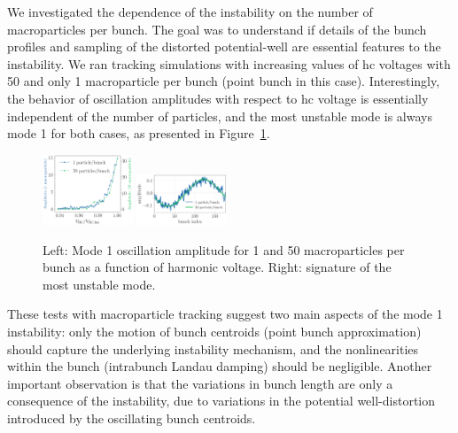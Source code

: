 \documentclass[a4paper,
               ]{jacow}
\begin{document}
We investigated the dependence of the instability on the number of macroparticles per bunch. The goal was to understand if details of the bunch profiles and sampling of the distorted potential-well are essential features to the instability. We ran tracking simulations with increasing values of \gls{hc} voltages with 50 and only 1 macroparticle per bunch (point bunch in this case). Interestingly, the behavior of oscillation amplitudes with respect to \gls{hc} voltage is essentially independent of the number of particles, and the most unstable mode is always mode 1 for both cases, as presented in Figure~\ref{fig:2}.\begin{figure}
    \centering
    \includegraphics[width=0.24\textwidth]{MOPS32_f2a.png}
    \includegraphics[width=0.24\textwidth]{MOPS32_f2b.png}
    \caption{Left: Mode 1 oscillation amplitude for 1 and 50 macroparticles per bunch as a function of harmonic voltage. Right: signature of the most unstable mode.}
    \label{fig:2}
\end{figure}

These tests with macroparticle tracking suggest two main aspects of the mode 1 instability: only the motion of bunch centroids (point bunch approximation) should capture the underlying instability mechanism, and the nonlinearities within the bunch (intrabunch Landau damping) should be negligible. Another important observation is that the variations in bunch length are only a consequence of the instability, due to variations in the potential well-distortion introduced by the oscillating bunch centroids.

\end{document}

